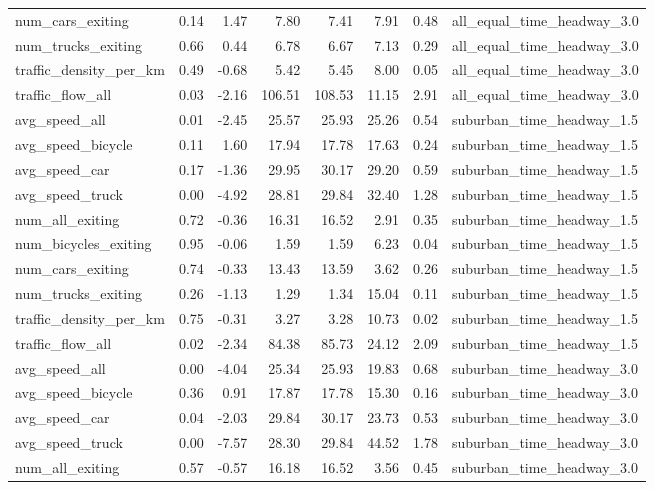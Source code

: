 \begin{table}[ht]
\begin{tabular}{lrrrrrrl}
  num\_cars\_exiting & 0.14 & 1.47 & 7.80 & 7.41 & 7.91 & 0.48 & all\_equal\_time\_headway\_3.0 \\ 
  num\_trucks\_exiting & 0.66 & 0.44 & 6.78 & 6.67 & 7.13 & 0.29 & all\_equal\_time\_headway\_3.0 \\ 
  traffic\_density\_per\_km & 0.49 & -0.68 & 5.42 & 5.45 & 8.00 & 0.05 & all\_equal\_time\_headway\_3.0 \\ 
  traffic\_flow\_all & 0.03 & -2.16 & 106.51 & 108.53 & 11.15 & 2.91 & all\_equal\_time\_headway\_3.0 \\ 
  avg\_speed\_all & 0.01 & -2.45 & 25.57 & 25.93 & 25.26 & 0.54 & suburban\_time\_headway\_1.5 \\ 
  avg\_speed\_bicycle & 0.11 & 1.60 & 17.94 & 17.78 & 17.63 & 0.24 & suburban\_time\_headway\_1.5 \\ 
  avg\_speed\_car & 0.17 & -1.36 & 29.95 & 30.17 & 29.20 & 0.59 & suburban\_time\_headway\_1.5 \\ 
  avg\_speed\_truck & 0.00 & -4.92 & 28.81 & 29.84 & 32.40 & 1.28 & suburban\_time\_headway\_1.5 \\ 
  num\_all\_exiting & 0.72 & -0.36 & 16.31 & 16.52 & 2.91 & 0.35 & suburban\_time\_headway\_1.5 \\ 
  num\_bicycles\_exiting & 0.95 & -0.06 & 1.59 & 1.59 & 6.23 & 0.04 & suburban\_time\_headway\_1.5 \\ 
  num\_cars\_exiting & 0.74 & -0.33 & 13.43 & 13.59 & 3.62 & 0.26 & suburban\_time\_headway\_1.5 \\ 
  num\_trucks\_exiting & 0.26 & -1.13 & 1.29 & 1.34 & 15.04 & 0.11 & suburban\_time\_headway\_1.5 \\ 
  traffic\_density\_per\_km & 0.75 & -0.31 & 3.27 & 3.28 & 10.73 & 0.02 & suburban\_time\_headway\_1.5 \\ 
  traffic\_flow\_all & 0.02 & -2.34 & 84.38 & 85.73 & 24.12 & 2.09 & suburban\_time\_headway\_1.5 \\ 
  avg\_speed\_all & 0.00 & -4.04 & 25.34 & 25.93 & 19.83 & 0.68 & suburban\_time\_headway\_3.0 \\ 
  avg\_speed\_bicycle & 0.36 & 0.91 & 17.87 & 17.78 & 15.30 & 0.16 & suburban\_time\_headway\_3.0 \\ 
  avg\_speed\_car & 0.04 & -2.03 & 29.84 & 30.17 & 23.73 & 0.53 & suburban\_time\_headway\_3.0 \\ 
  avg\_speed\_truck & 0.00 & -7.57 & 28.30 & 29.84 & 44.52 & 1.78 & suburban\_time\_headway\_3.0 \\ 
  num\_all\_exiting & 0.57 & -0.57 & 16.18 & 16.52 & 3.56 & 0.45 & suburban\_time\_headway\_3.0 \\ 

\end{tabular}
\end{table}
